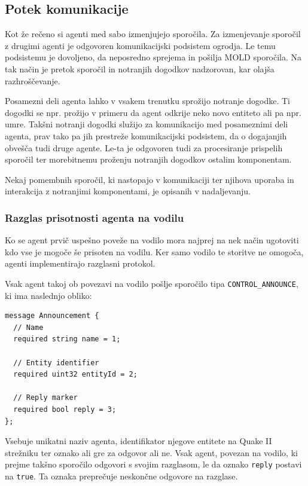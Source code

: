 \documentclass[a4paper,10pt]{article}
\begin{document}
\subsection{Potek komunikacije}

Kot že rečeno si agenti med sabo izmenjujejo sporočila. Za izmenjevanje sporočil z drugimi agenti je odgovoren komunikacijski podsistem ogrodja. Le temu podsistemu je dovoljeno, da neposredno sprejema in pošilja MOLD sporočila. Na tak način je pretok sporočil in notranjih dogodkov nadzorovan, kar olajša razhroščevanje.

Posamezni deli agenta lahko v vsakem trenutku sprožijo notranje dogodke. Ti dogodki se npr. prožijo v primeru da agent odkrije neko novo entiteto ali pa npr. umre. Takšni notranji dogodki služijo za komunikacijo med posameznimi deli agenta, prav tako pa jih prestreže komunikacijski podsistem, da o dogajanjih obvešča tudi druge agente. Le-ta je odgovoren tudi za procesiranje prispelih sporočil ter morebitnemu proženju notranjih dogodkov ostalim komponentam.

Nekaj pomembnih sporočil, ki nastopajo v komunikaciji ter njihova uporaba in interakcija z notranjimi komponentami, je opisanih v nadaljevanju.

\subsubsection{Razglas prisotnosti agenta na vodilu}

Ko se agent prvič uspešno poveže na vodilo mora najprej na nek način ugotoviti kdo vse je mogoče še prisoten na vodilu. Ker samo vodilo te storitve ne omogoča, agenti implementirajo razglasni protokol.

Vsak agent takoj ob povezavi na vodilo pošlje sporočilo tipa \texttt{CONTROL\_ANNOUNCE}, ki ima naslednjo obliko:
\begin{verbatim}
message Announcement {
  // Name
  required string name = 1;
  
  // Entity identifier
  required uint32 entityId = 2;
  
  // Reply marker
  required bool reply = 3;
};
\end{verbatim}

\noindent
Vsebuje unikatni naziv agenta, identifikator njegove entitete na Quake II strežniku ter oznako ali gre za odgovor ali ne. Vsak agent, povezan na vodilo, ki prejme takšno sporočilo odgovori s svojim razglasom, le da oznako \texttt{reply} postavi na \texttt{true}. Ta oznaka preprečuje neskončne odgovore na razglase.
\end{document}
